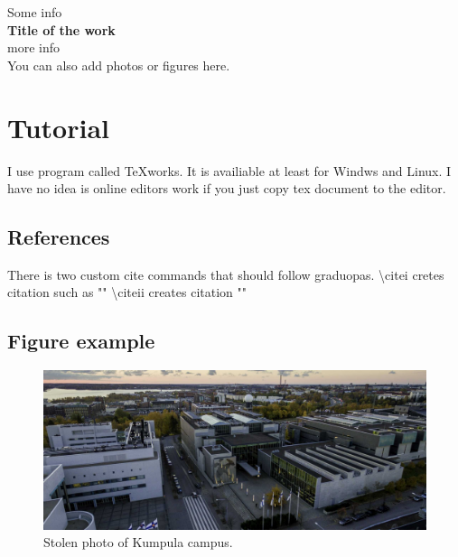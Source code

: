 \documentclass[12pt]{article}%
\begin{document}
\begin{titlepage}
\begin{center}
\vspace*{8cm}
Some info\\
\Large{\textbf{Title of the work}}\\
more info\\
\vspace*{4cm}
\tiny{You can also add photos or figures here.}
\end{center}
\end{titlepage}

\tableofcontents
\newpage

\section{Tutorial}
I use program called TeXworks. It is availiable at least for Windws and Linux. I have no idea is online editors work if you just copy tex document to the editor.

\subsection{References}
There is two custom cite commands that should follow graduopas. \textbackslash citei cretes citation such as "" \textbackslash citeii creates citation "" 

\subsection{Figure example}
\begin{figure}[h]
\includegraphics[width=\linewidth]{kumpula_ilmakuva.jpg}
\caption{Stolen photo of Kumpula campus.}
\end{figure}
\end{document}
